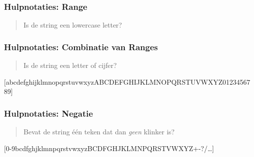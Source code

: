 \begin{frame}
  \frametitle{Hulpnotaties: Range}
  \begin{quote}
    Is de string een lowercase letter?
  \end{quote}
  \vskip2mm
  \begin{center} \ttfamily
    [abcdefghijklmnopqrstuvwxyz]
  \end{center}
  \vskip2mm
  \begin{center} \ttfamily
    [a-z]
  \end{center}
\end{frame}

\begin{frame}
  \frametitle{Hulpnotaties: Combinatie van Ranges}
  \begin{quote}
    Is de string een letter of cijfer?
  \end{quote}
  \vskip2mm
  \begin{center} \ttfamily\scriptsize
    [abcdefghijklmnopqrstuvwxyzABCDEFGHIJKLMNOPQRSTUVWXYZ0123456789]
  \end{center}
  \vskip2mm
  \begin{center} \ttfamily
    [a-zA-Z0-9]
  \end{center}
\end{frame}

\begin{frame}
  \frametitle{Hulpnotaties: Negatie}
  \begin{quote}
    Bevat de string \'e\'en teken dat dan \emph{geen} klinker is?
  \end{quote}
  \vskip2mm
  \begin{center} \ttfamily\scriptsize
    [0-9bcdfghjklmnpqrstvwxyzBCDFGHJKLMNPQRSTVWXYZ+-?/\dots]
  \end{center}
  \vskip2mm
  \begin{center} \ttfamily
    [\^{}aeiou]
  \end{center}
\end{frame}


